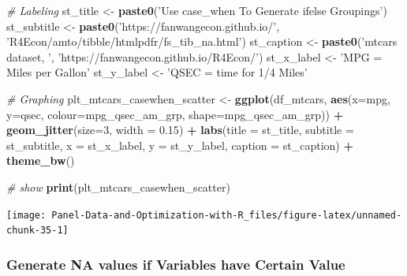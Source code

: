 \documentclass[
]{book}
\newenvironment{Shaded}{\begin{snugshade}}{\end{snugshade}}
\newcommand{\CommentTok}[1]{\textcolor[rgb]{0.56,0.35,0.01}{\textit{#1}}}
\newcommand{\DataTypeTok}[1]{\textcolor[rgb]{0.13,0.29,0.53}{#1}}
\newcommand{\DecValTok}[1]{\textcolor[rgb]{0.00,0.00,0.81}{#1}}
\newcommand{\FloatTok}[1]{\textcolor[rgb]{0.00,0.00,0.81}{#1}}
\newcommand{\KeywordTok}[1]{\textcolor[rgb]{0.13,0.29,0.53}{\textbf{#1}}}
\newcommand{\NormalTok}[1]{#1}
\newcommand{\OperatorTok}[1]{\textcolor[rgb]{0.81,0.36,0.00}{\textbf{#1}}}
\newcommand{\StringTok}[1]{\textcolor[rgb]{0.31,0.60,0.02}{#1}}
\begin{document}
\begin{Shaded}
\begin{Highlighting}[]
\CommentTok{# Labeling}
\NormalTok{st_title <-}\StringTok{ }\KeywordTok{paste0}\NormalTok{(}\StringTok{'Use case_when To Generate ifelse Groupings'}\NormalTok{)}
\NormalTok{st_subtitle <-}\StringTok{ }\KeywordTok{paste0}\NormalTok{(}\StringTok{'https://fanwangecon.github.io/'}\NormalTok{,}
                      \StringTok{'R4Econ/amto/tibble/htmlpdfr/fs_tib_na.html'}\NormalTok{)}
\NormalTok{st_caption <-}\StringTok{ }\KeywordTok{paste0}\NormalTok{(}\StringTok{'mtcars dataset, '}\NormalTok{,}
                     \StringTok{'https://fanwangecon.github.io/R4Econ/'}\NormalTok{)}
\NormalTok{st_x_label <-}\StringTok{ 'MPG = Miles per Gallon'}
\NormalTok{st_y_label <-}\StringTok{ 'QSEC = time for 1/4 Miles'}

\CommentTok{# Graphing}
\NormalTok{plt_mtcars_casewhen_scatter <-}\StringTok{ }
\StringTok{  }\KeywordTok{ggplot}\NormalTok{(df_mtcars, }
         \KeywordTok{aes}\NormalTok{(}\DataTypeTok{x=}\NormalTok{mpg, }\DataTypeTok{y=}\NormalTok{qsec, }
             \DataTypeTok{colour=}\NormalTok{mpg_qsec_am_grp, }
             \DataTypeTok{shape=}\NormalTok{mpg_qsec_am_grp)) }\OperatorTok{+}
\StringTok{  }\KeywordTok{geom_jitter}\NormalTok{(}\DataTypeTok{size=}\DecValTok{3}\NormalTok{, }\DataTypeTok{width =} \FloatTok{0.15}\NormalTok{) }\OperatorTok{+}
\StringTok{  }\KeywordTok{labs}\NormalTok{(}\DataTypeTok{title =}\NormalTok{ st_title, }\DataTypeTok{subtitle =}\NormalTok{ st_subtitle,}
       \DataTypeTok{x =}\NormalTok{ st_x_label, }\DataTypeTok{y =}\NormalTok{ st_y_label, }\DataTypeTok{caption =}\NormalTok{ st_caption) }\OperatorTok{+}
\StringTok{  }\KeywordTok{theme_bw}\NormalTok{()}

\CommentTok{# show}
\KeywordTok{print}\NormalTok{(plt_mtcars_casewhen_scatter)}
\end{Highlighting}
\end{Shaded}

\begin{center}\texttt{[image: Panel-Data-and-Optimization-with-R\_files/figure-latex/unnamed-chunk-35-1]} \end{center}

\hypertarget{generate-na-values-if-variables-have-certain-value}{%
\subsubsection{Generate NA values if Variables have Certain Value}\label{generate-na-values-if-variables-have-certain-value}}
\end{document}
